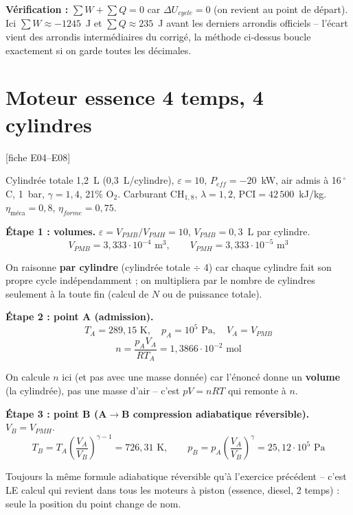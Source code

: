 \documentclass[11pt,a4paper]{article}
\newcommand{\fiche}[1]{\hfill{\small\color{cgris}[fiche #1]}}
\begin{document}
\begin{verif}
\textbf{Vérification :} $\sum W + \sum Q = 0$ car $\Delta U_{cycle}=0$ (on revient au point de
départ). Ici $\sum W \approx -1245$~J et $\sum Q\approx 235$~J avant les derniers arrondis officiels
-- l'écart vient des arrondis intermédiaires du corrigé, la méthode ci-dessus boucle exactement si on
garde toutes les décimales.
\end{verif}

\newpage
\section{Moteur essence 4 temps, 4 cylindres}
\fiche{E04--E08}

\begin{enonce}
Cylindrée totale 1,2~L (0,3~L/cylindre), $\varepsilon=10$, $P_{eff}=-20$~kW, air admis à
16$\,^\circ$C, 1~bar, $\gamma=1{,}4$, 21\% O$_2$. Carburant CH$_{1,8}$, $\lambda=1{,}2$,
PCI$=42\,500$~kJ/kg. $\eta_{\text{méca}}=0{,}8$, $\eta_{forme}=0{,}75$.
\end{enonce}

\begin{calc}
\textbf{Étape 1 : volumes.} $\varepsilon=V_{PMB}/V_{PMH}=10$, $V_{PMB}=0{,}3$~L par cylindre.
\[ V_{PMB}=3{,}333\cdot10^{-4}\text{ m}^3,\qquad V_{PMH}=3{,}333\cdot10^{-5}\text{ m}^3 \]
\end{calc}
\begin{pourquoi}
On raisonne \textbf{par cylindre} (cylindrée totale $\div$ 4) car chaque cylindre fait son propre
cycle indépendamment ; on multipliera par le nombre de cylindres seulement à la toute fin (calcul de
$N$ ou de puissance totale).
\end{pourquoi}

\begin{calc}
\textbf{Étape 2 : point A (admission).}
\[ T_A=289{,}15\text{ K},\quad p_A=10^5\text{ Pa},\quad V_A=V_{PMB} \]
\[ n=\frac{p_AV_A}{RT_A} = 1{,}3866\cdot10^{-2}\text{ mol} \]
\end{calc}
\begin{pourquoi}
On calcule $n$ ici (et pas avec une masse donnée) car l'énoncé donne un \textbf{volume} (la
cylindrée), pas une masse d'air -- c'est $pV=nRT$ qui remonte à $n$.
\end{pourquoi}

\begin{calc}
\textbf{Étape 3 : point B (A$\to$B compression adiabatique réversible).} $V_B=V_{PMH}$.
\[ T_B = T_A\left(\frac{V_A}{V_B}\right)^{\gamma-1} = 726{,}31\text{ K},\qquad
p_B = p_A\left(\frac{V_A}{V_B}\right)^{\gamma} = 25{,}12\cdot10^5\text{ Pa} \]
\end{calc}
\begin{pourquoi}
Toujours la même formule adiabatique réversible qu'à l'exercice précédent -- c'est LE calcul qui
revient dans tous les moteurs à piston (essence, diesel, 2 temps) : seule la position du point
change de nom.
\end{pourquoi}
\end{document}
